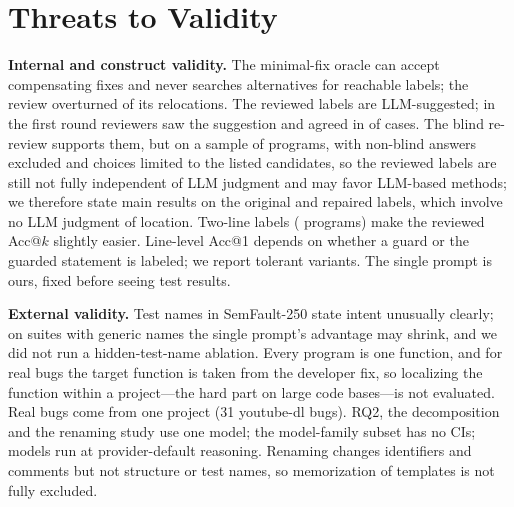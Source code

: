 \section{Threats to Validity}
\label{sec:threats}

\textbf{Internal and construct validity.} The minimal-fix oracle can accept compensating fixes and never searches
alternatives for reachable labels; the review overturned \ReviewCorrectedOverturnedN{} of its relocations. The reviewed
labels are LLM-suggested; in the first round reviewers saw the suggestion and agreed in \ReviewAgreeN{} of \ReviewHumanN{}
cases. The blind re-review supports them, but on a sample of \BlindBlindAllPrograms{} programs, with
\BlindAnswersExcluded{} non-blind answers excluded and choices limited to the listed candidates, so the reviewed labels are
still not fully independent of LLM judgment and may favor LLM-based methods; we therefore state main results on the original and
repaired labels, which involve no LLM judgment of location. Two-line labels (\LabaudAllTwoLine{} programs) make the reviewed
Acc@$k$ slightly easier. Line-level Acc@1 depends on whether a guard or the guarded statement is labeled; we report tolerant
variants. The single prompt is ours, fixed before seeing test results. 

\textbf{External validity.} Test names in SemFault-250 state intent unusually clearly; on suites with generic names the
single prompt's advantage may shrink, and we did not run a hidden-test-name ablation. Every program is one function, and
for real bugs the target function is taken from the developer fix, so localizing the function within a project---the
hard part on large code bases---is not evaluated. Real bugs come from one project (31 youtube-dl bugs). RQ2, the
decomposition and the renaming study use one model; the model-family subset has no CIs; models run at provider-default
reasoning. Renaming changes identifiers and comments but not structure or test names, so memorization of templates is
not fully excluded.
